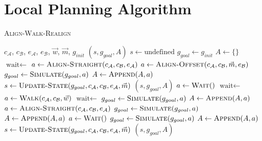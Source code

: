 \section{Local Planning Algorithm}
\label{sec:local_algo}

\begin{algorithm}
	\caption{\scshape Align-Walk-Realign}
	\label{algo:local_algo}
	\begin{algorithmic}[1]
		\REQUIRE $c_\mathcal{A}$, $c_\mathcal{B}$, $e_\mathcal{A}$, $e_\mathcal{B}$, $\vec{w}$, $\vec{m}$, $g_{init}$ 
		\ENSURE $(s, g_{goal}, A)$ 
		\STATE $s \gets \text{undefined}$
		\STATE $g_{goal} \gets g_{init}$
		\STATE $A \gets \{\}$
		\STATE $\text{wait} \gets$ \TRUE
		\LOOP
				\STATE $a \gets \text{\scshape Align-Straight}(c_\mathcal{A}, c_\mathcal{B}, e_\mathcal{A})$
			\ELSE
				\STATE $a \gets \text{\scshape Align-Offset}(c_\mathcal{A}, c_\mathcal{B}, \vec{m}, e_\mathcal{B})$
			\ENDIF
			\STATE $g_{goal} \gets \text{\scshape Simulate}(g_{goal}, a)$
			\STATE $A \gets \text{\scshape Append}(A, a)$
			\STATE $s \gets \text{\scshape Update-State}(g_{goal}, c_\mathcal{A}, c_\mathcal{B}, e_\mathcal{A}, \vec{m})$
				\RETURN $(s, g_{goal}, A)$
			\ENDIF
				\STATE $a \gets \text{\scshape Wait}()$
				\STATE $\text{wait} \gets$ \FALSE
			\ELSE
				\STATE $a \gets \text{\scshape Walk}(c_\mathcal{A}, c_\mathcal{B}, \vec{w})$ 
				\STATE $\text{wait} \gets$ \TRUE
			\ENDIF
			\STATE $g_{goal} \gets \text{\scshape Simulate}(g_{goal}, a)$
			\STATE $A \gets \text{\scshape Append}(A, a)$
				\STATE $a \gets \text{\scshape Align-Straight}(c_\mathcal{A}, c_\mathcal{B}, e_\mathcal{A})$ 
				\STATE $g_{goal} \gets \text{\scshape Simulate}(g_{goal}, a)$
				\STATE $A \gets \text{\scshape Append}(A, a)$
					\STATE $a \gets \text{\scshape Wait}()$
					\STATE $g_{goal} \gets \text{\scshape Simulate}(g_{goal}, a)$
					\STATE $A \gets \text{\scshape Append}(A, a)$
				\ENDWHILE
			\ENDIF
			\STATE $s \gets \text{\scshape Update-State}(g_{goal}, c_\mathcal{A}, c_\mathcal{B}, e_\mathcal{A}, \vec{m})$
				\RETURN $(s, g_{goal}, A)$
			\ENDIF
		\ENDLOOP 
	\end{algorithmic}
\end{algorithm}

